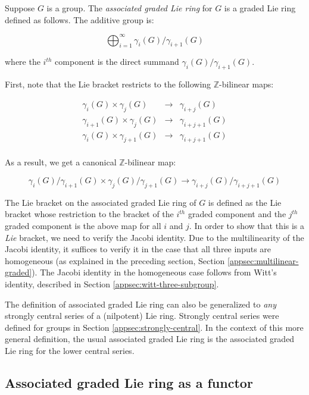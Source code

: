 Suppose $G$ is a group. The {\em associated graded Lie ring} for $G$
is a graded Lie ring defined as follows. The additive group is:

$$\bigoplus_{i=1}^\infty \gamma_i(G)/\gamma_{i+1}(G)$$

where the $i^{th}$ component is the direct summand
$\gamma_i(G)/\gamma_{i+1}(G)$.

First, note that the Lie bracket restricts to the following
$\mathbb{Z}$-bilinear maps:

\begin{eqnarray*}
  \gamma_i(G) \times \gamma_j(G) & \to & \gamma_{i+j}(G)\\
  \gamma_{i+1}(G) \times \gamma_j(G) & \to & \gamma_{i+j+1}(G)\\
  \gamma_i(G) \times \gamma_{j+1}(G) & \to & \gamma_{i+j+1}(G)\\
\end{eqnarray*}

As a result, we get a canonical $\mathbb{Z}$-bilinear map:

$$\gamma_i(G)/\gamma_{i+1}(G) \times \gamma_j(G)/\gamma_{j+1}(G) \to \gamma_{i+j}(G)/\gamma_{i+j+1}(G)$$

The Lie bracket on the associated graded Lie ring of $G$ is defined as
the Lie bracket whose restriction to the bracket of the $i^{th}$
graded component and the $j^{th}$ graded component is the above map
for all $i$ and $j$. In order to show that this is a {\em Lie}
bracket, we need to verify the Jacobi identity. Due to the
multilinearity of the Jacobi identity, it suffices to verify it in the
case that all three inputs are homogeneous (as explained in the
preceding section, Section \ref{appsec:multilinear-graded}). The
Jacobi identity in the homogeneous case follows from Witt's identity,
described in Section \ref{appsec:witt-three-subgroup}.

The definition of associated graded Lie ring can also be generalized
to {\em any} strongly central series of a (nilpotent) Lie
ring. Strongly central series were defined for groups in Section
\ref{appsec:strongly-central}. In the context of this more general
definition, the usual associated graded Lie ring is the associated
graded Lie ring for the lower central series.

\subsection{Associated graded Lie ring as a functor}\label{appsec:associated-graded-functor}

